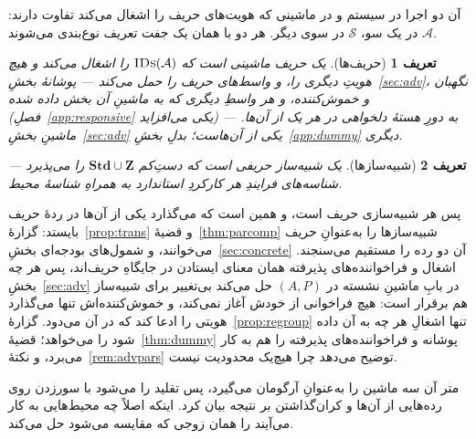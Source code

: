 \documentclass[10pt,oneside,openany]{book}
\newcommand{\Zpid}{\mathbf{Z}}
\newcommand{\Stdpid}{\mathbf{Std}}
\newcommand{\Adv}{\mathcal{A}}
\newcommand{\Sim}{\mathcal{S}}
\newcommand{\op}[1]{\textnormal{\textsc{#1}}}
\newcommand{\IDs}{\op{IDs}}
\theoremstyle{accentdef}
\newtheorem{definition}{تعریف}[chapter]
\theoremstyle{accentplain}
\begin{document}
آن دو اجرا در سیستم و در ماشینی که هویت‌های حریف را اشغال می‌کند تفاوت
دارند: $\Adv$ در یک سو، $\Sim$ در سوی دیگر. هر دو با همان یک جفت تعریف
نوع‌بندی می‌شوند.

\begin{definition}[حریف‌ها]\label{def:advcls}
یک \emph{حریف} ماشینی است که $\IDs(\Adv)$ را اشغال می‌کند و هیچ هویتِ
دیگری را، و واسط‌های حریف را حمل می‌کند --- پوشانهٔ بخشِ~\ref{sec:adv}،
نگهبان و خموش‌کننده، و هر واسطِ دیگری که به ماشینِ آن بخش داده شده
(فصلِ~\ref{app:responsive} یکی می‌افزاید) --- به دورِ هستهٔ دلخواهی در هر
یک از آن‌ها. ماشینِ بخشِ~\ref{sec:adv} یکی از آن‌هاست؛ بدلِ
بخشِ~\ref{app:dummy} دیگری.
\end{definition}

\begin{definition}[شبیه‌سازها]\label{def:sim}
یک \emph{شبیه‌ساز} حریفی است که دستِ‌کم $\Stdpid \cup \Zpid$ را می‌پذیرد
--- شناسه‌های فرایندِ هر کارکردِ استاندارد به همراهِ شناسهٔ محیط.
\end{definition}

پس هر شبیه‌سازی حریف است، و همین است که می‌گذارد یکی از آن‌ها در ردهٔ
حریف بایستد: گزارهٔ~\ref{prop:trans} و قضیهٔ~\ref{thm:parcomp}
شبیه‌سازها را به‌عنوانِ حریف می‌خوانند، و شمول‌های بودجه‌ای
بخشِ~\ref{sec:concrete} آن دو رده را مستقیم می‌سنجند. اشغال و
فراخواننده‌های پذیرفته همان معنای ایستادن در جایگاهِ حریف‌اند، پس هر چه
بخشِ~\ref{sec:adv} در بابِ ماشینِ نشسته در $(A,P)$ حل می‌کند بی‌تغییر
برای شبیه‌ساز هم برقرار است: هیچ فراخوانی از خودش آغاز نمی‌کند، و
خموش‌کننده‌اش تنها می‌گذارد هویتی را ادعا کند که در آن می‌دود.
گزارهٔ~\ref{prop:regroup} تنها اشغالِ هر چه به آن داده شود را می‌خواهد؛
قضیهٔ~\ref{thm:dummy} پوشانه و فراخواننده‌های پذیرفته را هم به کار
می‌برد، و نکتهٔ~\ref{rem:advpars} توضیح می‌دهد چرا هیچ‌یک محدودیت نیست.

متر آن سه ماشین را به‌عنوانِ آرگومان می‌گیرد، پس تقلید را می‌شود با
سور‌زدن روی رده‌هایی از آن‌ها و کران‌گذاشتن بر نتیجه بیان کرد. اینکه
اصلاً چه محیط‌هایی به کار می‌آیند را همان زوجی که مقایسه می‌شود حل
می‌کند.
\end{document}
